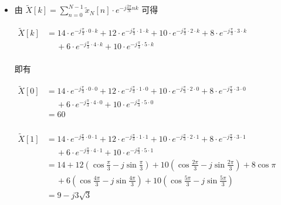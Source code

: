 \documentclass[a4paper,UTF8]{article}
\numberwithin{equation}{section}
\renewcommand{\tilde}{\widetilde}
\begin{document}
	\begin{framed}
		\begin{spacing}{1.5}
			\begin{itemize}
				\item 

        由 $\displaystyle \tilde{X}[k] = \sum_{n=0}^{N-1}\tilde{x}_{N}[n]\cdot e^{-j\frac{2\pi}{N}nk}$ 可得

        $
        \begin{aligned}
        \tilde{X}[k] & = 14 \cdot e^{-j \frac{\pi}{3} \cdot 0 \cdot k} + 12 \cdot e^{-j \frac{\pi}{3} \cdot 1 \cdot k} + 10 \cdot e^{-j \frac{\pi}{3} \cdot 2 \cdot k} + 8 \cdot e^{-j \frac{\pi}{3} \cdot 3 \cdot k}  \\
        &\quad\ + 6 \cdot e^{-j \frac{\pi}{3} \cdot 4 \cdot k} + 10 \cdot e^{-j \frac{\pi}{3} \cdot 5 \cdot k}  \\
        \end{aligned}
        $
        
        即有
        
        $
        \begin{aligned}
        \tilde{X}[0] & = 14 \cdot e^{-j \frac{\pi}{3} \cdot 0 \cdot 0} + 12 \cdot e^{-j \frac{\pi}{3} \cdot 1 \cdot 0} + 10 \cdot e^{-j \frac{\pi}{3} \cdot 2 \cdot 0} + 8 \cdot e^{-j \frac{\pi}{3} \cdot 3 \cdot 0}  \\
        &\quad\ + 6 \cdot e^{-j \frac{\pi}{3} \cdot 4 \cdot 0} + 10 \cdot e^{-j \frac{\pi}{3} \cdot 5 \cdot 0}  \\
        & = 60  \\
        \end{aligned}
        $
        
        $
        \begin{aligned}
        \tilde{X}[1] & = 14 \cdot e^{-j \frac{\pi}{3} \cdot 0 \cdot 1} + 12 \cdot e^{-j \frac{\pi}{3} \cdot 1 \cdot 1} + 10 \cdot e^{-j \frac{\pi}{3} \cdot 2 \cdot 1} + 8 \cdot e^{-j \frac{\pi}{3} \cdot 3 \cdot 1} \\
        &\quad\ + 6 \cdot e^{-j \frac{\pi}{3} \cdot 4 \cdot 1} + 10 \cdot e^{-j \frac{\pi}{3} \cdot 5 \cdot 1}  \\
        & = 14 + 12(\cos\frac{\pi}{3} - j\sin\frac{\pi}{3}) + 10(\cos\frac{2\pi}{3} - j\sin\frac{2\pi}{3}) + 8\cos\pi  \\
        &\quad\ + 6(\cos\frac{4\pi}{3} - j\sin\frac{4\pi}{3}) + 10(\cos\frac{5\pi}{3} - j\sin\frac{5\pi}{3})  \\
        & = 9 - j 3 \sqrt{3}  \\
        \end{aligned}
        $
        

\end{itemize}
\end{spacing}
\end{framed}
\end{document}
